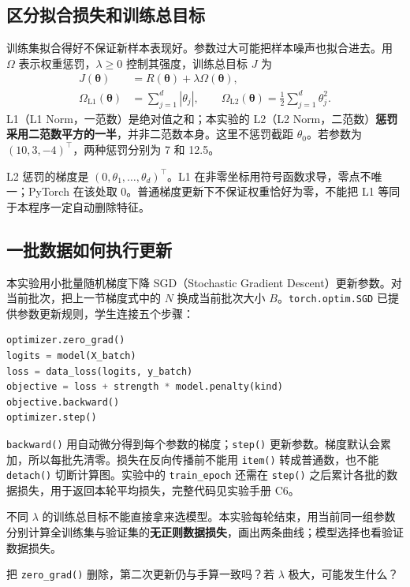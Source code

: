 \documentclass[UTF8,a4paper,11pt,fontset=fandol]{ctexart}
\begin{document}
\subsection{区分拟合损失和训练总目标}
训练集拟合得好不保证新样本表现好。参数过大可能把样本噪声也拟合进去。用 $\Omega$ 表示权重惩罚，$\lambda\ge0$ 控制其强度，训练总目标 $J$ 为
\begin{equation}
\begin{aligned}
J(\boldsymbol\theta)&=R(\boldsymbol\theta)+\lambda\Omega(\boldsymbol\theta),\\
\Omega_{\mathrm{L1}}(\boldsymbol\theta)&=\sum_{j=1}^d|\theta_j|,\qquad
\Omega_{\mathrm{L2}}(\boldsymbol\theta)=\frac12\sum_{j=1}^d\theta_j^2.
\end{aligned}
\end{equation}
L1（L1 Norm，一范数）是绝对值之和；本实验的 L2（L2 Norm，二范数）\textbf{惩罚采用二范数平方的一半}，并非二范数本身。这里不惩罚截距 $\theta_0$。若参数为 $(10,3,-4)^\top$，两种惩罚分别为 7 和 12.5。

L2 惩罚的梯度是 $(0,\theta_1,\ldots,\theta_d)^\top$。L1 在非零坐标用符号函数求导，零点不唯一；PyTorch 在该处取 0。普通梯度更新下不保证权重恰好为零，不能把 L1 等同于本程序一定自动删除特征。
\subsection{一批数据如何执行更新}
本实验用小批量随机梯度下降 SGD（Stochastic Gradient Descent）更新参数。对当前批次，把上一节梯度式中的 $N$ 换成当前批次大小 $B$。\texttt{torch.optim.SGD} 已提供参数更新规则，学生连接五个步骤：
\begin{lstlisting}[language=Python]
optimizer.zero_grad()
logits = model(X_batch)
loss = data_loss(logits, y_batch)
objective = loss + strength * model.penalty(kind)
objective.backward()
optimizer.step()
\end{lstlisting}
\texttt{backward()} 用自动微分得到每个参数的梯度；\texttt{step()} 更新参数。梯度默认会累加，所以每批先清零。损失在反向传播前不能用 \texttt{item()} 转成普通数，也不能 \texttt{detach()} 切断计算图。实验中的 \texttt{train\_epoch} 还需在 \texttt{step()} 之后累计各批的数据损失，用于返回本轮平均损失，完整代码见实验手册 C6。
\begin{pitfallbox}[曲线必须比较同一种量]
不同 $\lambda$ 的训练总目标不能直接拿来选模型。本实验每轮结束，用当前同一组参数分别计算全训练集与验证集的\textbf{无正则数据损失}，画出两条曲线；模型选择也看验证数据损失。
\end{pitfallbox}
\begin{questionbox}[检查点 C5/C6]
把 \texttt{zero\_grad()} 删除，第二次更新仍与手算一致吗？若 $\lambda$ 极大，可能发生什么？
\end{questionbox}
\clearpage
\end{document}
